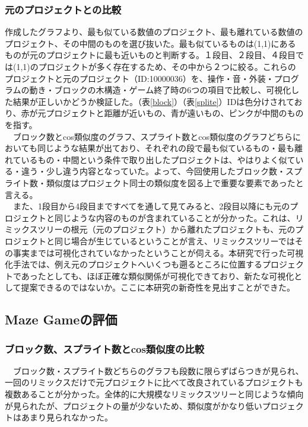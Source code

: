 \documentclass[a4paper,10pt,onecolumn,oneside,openany]{jsbook}
\begin{document}
\subsubsection{元のプロジェクトとの比較}
作成したグラフより、最も似ている数値のプロジェクト、最も離れている数値のプロジェクト、その中間のものを選び抜いた。最も似ているものは(1,1)にあるものが元のプロジェクトに最も近いものと判断する。１段目、２段目、４段目では(1,1)のプロジェクトが多く存在するため、その中から２つに絞る。これらのプロジェクトと元のプロジェクト（ID:10000036）を、操作・音・外装・プログラムの動き・ブロックの木構造・ゲーム終了時の6つの項目で比較し、可視化した結果が正しいかどうか検証した。（表\ref{block}）（表\ref{splite}）IDは色分けされており、赤が元プロジェクトと距離が近いもの、青が遠いもの、ピンクが中間のものを指す。
\\
　ブロック数とcos類似度のグラフ、スプライト数とcos類似度のグラフどちらにおいても同じような結果が出ており、それぞれの段で最も似ているもの・最も離れているもの・中間という条件で取り出したプロジェクトは、やはりよく似ている・違う・少し違う内容となっていた。よって、今回使用したブロック数・スプライト数・類似度はプロジェクト同士の類似度を図る上で重要な要素であったと言える。
\\
　また、1段目から4段目まですべてを通して見てみると、2段目以降にも元のプロジェクトと同じような内容のものが含まれていることが分かった。これは、リミックスツリーの根元（元のプロジェクト）から離れたプロジェクトも、元のプロジェクトと同じ場合が生じているということが言え、リミックスツリーではその事実までは可視化されていなかったということが伺える。本研究で行った可視化手法では、例え元のプロジェクトへいくつも遡るところに位置するプロジェクトであったとしても、ほぼ正確な類似関係が可視化できており、新たな可視化として提案できるのではないか。ここに本研究の新奇性を見出すことができた。

\newpage
\subsection{Maze Gameの評価}
\subsubsection{ブロック数、スプライト数とcos類似度の比較}
　ブロック数・スプライト数どちらのグラフも段数に限らずばらつきが見られ、一回のリミックスだけで元プロジェクトに比べて改良されているプロジェクトも複数あることが分かった。全体的に大規模なリミックスツリーと同じような傾向が見られたが、プロジェクトの量が少ないため、類似度がかなり低いプロジェクトはあまり見られなかった。
\end{document}
